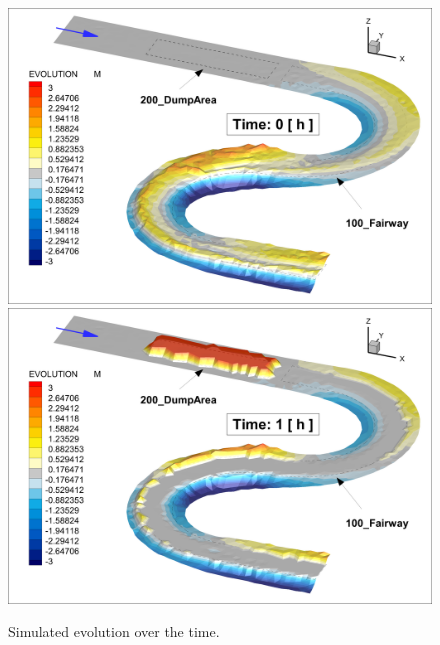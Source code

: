 \begin{figure} [!h]
	\centering
	\includegraphics[scale=0.14]{../img/critDig_Poly_000h.png}
	\includegraphics[scale=0.14]{../img/critDig_Poly_001h.png}
	\caption{Simulated evolution over the time.}\label{result12}
\end{figure}

